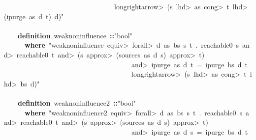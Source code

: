 \documentclass{article}
\newcommand{\syntaxKEYWORDA}[1]{\textcolor[rgb]{0.0,0.4,0.6}{\textbf{#1}}}
\newcommand{\syntaxKEYWORDB}[1]{\textcolor[rgb]{0.0,0.6,0.4}{\textbf{#1}}}
\newcommand{\syntaxLITERALA}[1]{\textcolor[rgb]{1.0,0.0,0.8}{#1}}
\newcommand{\syntaxOPERATOR}[1]{\textcolor[rgb]{0.0,0.0,0.0}{\textbf{#1}}}
\newcommand{\syntaxKEYWORDA}[1]{\textcolor[rgb]{0.0,0.4,0.6}{\textbf{#1}}}
\newcommand{\syntaxKEYWORDB}[1]{\textcolor[rgb]{0.0,0.6,0.4}{\textbf{#1}}}
\newcommand{\syntaxLITERALA}[1]{\textcolor[rgb]{1.0,0.0,0.8}{#1}}
\newcommand{\syntaxOPERATOR}[1]{\textcolor[rgb]{0.0,0.0,0.0}{\textbf{#1}}}
\newcommand{\syntaxKEYWORDA}[1]{\textcolor[rgb]{0.0,0.4,0.6}{\textbf{#1}}}
\newcommand{\syntaxKEYWORDB}[1]{\textcolor[rgb]{0.0,0.6,0.4}{\textbf{#1}}}
\newcommand{\syntaxLITERALA}[1]{\textcolor[rgb]{1.0,0.0,0.8}{#1}}
\newcommand{\syntaxOPERATOR}[1]{\textcolor[rgb]{0.0,0.0,0.0}{\textbf{#1}}}
\newcommand{\syntaxKEYWORDA}[1]{\textcolor[rgb]{0.0,0.4,0.6}{#1}}
\newcommand{\syntaxKEYWORDB}[1]{\textcolor[rgb]{0.0,0.6,0.4}{#1}}
\newcommand{\syntaxLITERALA}[1]{\textcolor[rgb]{1.0,0.0,0.8}{\textbf{#1}}}
\newcommand{\syntaxOPERATOR}[1]{\textcolor[rgb]{0.0,0.0,0.0}{#1}}
\newcommand{\syntaxKEYWORDA}[1]{\textcolor[rgb]{0.0,0.4,0.6}{\textbf{#1}}}
\newcommand{\syntaxKEYWORDB}[1]{\textcolor[rgb]{0.0,0.6,0.4}{\textbf{#1}}}
\newcommand{\syntaxLITERALA}[1]{\textcolor[rgb]{1.0,0.0,0.8}{#1}}
\newcommand{\syntaxOPERATOR}[1]{\textcolor[rgb]{0.0,0.0,0.0}{\textbf{#1}}}
\newcommand{\syntaxKEYWORDA}[1]{\textcolor[rgb]{0.0,0.4,0.6}{\textbf{#1}}}
\newcommand{\syntaxKEYWORDB}[1]{\textcolor[rgb]{0.0,0.6,0.4}{\textbf{#1}}}
\newcommand{\syntaxLITERALA}[1]{\textcolor[rgb]{1.0,0.0,0.8}{#1}}
\newcommand{\syntaxOPERATOR}[1]{\textcolor[rgb]{0.0,0.0,0.0}{\textbf{#1}}}
\begin{document}
\syntaxLITERALA{{\ }{\ }{\ }{\ }{\ }{\ }{\ }{\ }{\ }{\ }{\ }{\ }{\ }{\ }{\ }{\ }{\ }{\ }{\ }{\ }{\ }{\ }{\ }{\ }{\ }{\ }{\ }{\ }{\ }{\ }{\ }{\ }\<longrightarrow>{\ }(s{\ }\<lhd>{\ }as{\ }\<cong>{\ }t{\ }\<lhd>{\ }(ipurge{\ }as{\ }d{\ }t){\ }\usebox{\atbox}{\ }d)"}\hspace*{\fill}\\
\hspace*{\fill}\\
{\ }{\ }{\ }{\ }\syntaxKEYWORDA{definition}{\ }weak\usebox{\underscorebox}noninfluence{\ }\syntaxOPERATOR{::}\syntaxLITERALA{"bool"}{\ }\hspace*{\fill}\\
{\ }{\ }{\ }{\ }{\ }{\ }\syntaxKEYWORDB{where}{\ }\syntaxLITERALA{"weak\usebox{\underscorebox}noninfluence{\ }\<equiv>{\ }\<forall>{\ }d{\ }as{\ }bs{\ }s{\ }t{\ }.{\ }reachable0{\ }s{\ }\<and>{\ }reachable0{\ }t{\ }\<and>{\ }(s{\ }\<approx>{\ }(sources{\ }as{\ }d{\ }s){\ }\<approx>{\ }t){\ }}\hspace*{\fill}\\
\syntaxLITERALA{{\ }{\ }{\ }{\ }{\ }{\ }{\ }{\ }{\ }{\ }{\ }{\ }{\ }{\ }{\ }{\ }{\ }{\ }{\ }{\ }{\ }{\ }{\ }{\ }{\ }{\ }{\ }{\ }{\ }{\ }{\ }{\ }{\ }{\ }{\ }{\ }{\ }\<and>{\ }ipurge{\ }as{\ }d{\ }t{\ }={\ }ipurge{\ }bs{\ }d{\ }t}\hspace*{\fill}\\
\syntaxLITERALA{{\ }{\ }{\ }{\ }{\ }{\ }{\ }{\ }{\ }{\ }{\ }{\ }{\ }{\ }{\ }{\ }{\ }{\ }{\ }{\ }{\ }{\ }{\ }{\ }{\ }{\ }{\ }{\ }{\ }{\ }{\ }{\ }{\ }{\ }{\ }{\ }{\ }\<longrightarrow>{\ }(s{\ }\<lhd>{\ }as{\ }\<cong>{\ }t{\ }\<lhd>{\ }bs{\ }\usebox{\atbox}{\ }d)"}\hspace*{\fill}\\
\hspace*{\fill}\\
{\ }{\ }{\ }{\ }\syntaxKEYWORDA{definition}{\ }weak\usebox{\underscorebox}noninfluence2{\ }\syntaxOPERATOR{::}\syntaxLITERALA{"bool"}{\ }\hspace*{\fill}\\
{\ }{\ }{\ }{\ }{\ }{\ }\syntaxKEYWORDB{where}{\ }\syntaxLITERALA{"weak\usebox{\underscorebox}noninfluence2{\ }\<equiv>{\ }\<forall>{\ }d{\ }as{\ }bs{\ }s{\ }t{\ }.{\ }reachable0{\ }s{\ }\<and>{\ }reachable0{\ }t{\ }\<and>{\ }(s{\ }\<approx>{\ }(sources{\ }as{\ }d{\ }s){\ }\<approx>{\ }t){\ }}\hspace*{\fill}\\
\syntaxLITERALA{{\ }{\ }{\ }{\ }{\ }{\ }{\ }{\ }{\ }{\ }{\ }{\ }{\ }{\ }{\ }{\ }{\ }{\ }{\ }{\ }{\ }{\ }{\ }{\ }{\ }{\ }{\ }{\ }{\ }{\ }{\ }{\ }{\ }{\ }{\ }{\ }{\ }\<and>{\ }ipurge{\ }as{\ }d{\ }s{\ }={\ }ipurge{\ }bs{\ }d{\ }t}\hspace*{\fill}\\
\end{document}
